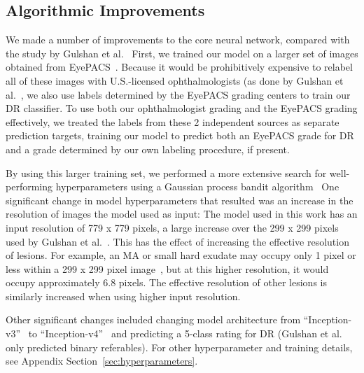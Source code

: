 \documentclass{llncs}
\begin{document}
\subsection{Algorithmic Improvements}
We made a number of improvements to the core neural network, compared with the study by Gulshan et al.~\cite{gulshan2016development} First, we trained our model on a larger set of images obtained from EyePACS~\cite{cuadros2009eyepacs}. Because it would be prohibitively expensive to relabel all of these images with U.S.-licensed ophthalmologists (as done by Gulshan et al.~\cite{gulshan2016development}, we also use labels determined by the EyePACS grading centers to train our DR classifier. To use both our ophthalmologist grading and the EyePACS grading effectively, we treated the labels from these 2 independent sources as separate prediction targets, training our model to predict both an EyePACS grade for DR and a grade determined by our own labeling procedure, if present.


By using this larger training set, we performed a more extensive search for well-performing hyperparameters using a Gaussian process bandit algorithm~\cite{golovin2017google} One significant change in model hyperparameters that resulted was an increase in the resolution of images the model used as input: The model used in this work has an input resolution of 779 x 779 pixels, a large increase over the 299 x 299 pixels used by Gulshan et al.~\cite{gulshan2016development}. This has the effect of increasing the effective resolution of lesions. For example, an MA or small hard exudate may occupy only 1 pixel or less within a 299 x 299 pixel image~\cite{kolb1995facts,scanlon2017practical}, but at this higher resolution, it would occupy approximately 6.8 pixels. The effective resolution of other lesions is similarly increased when using higher input resolution.

Other significant changes included changing model architecture from ``Inception-v3''~\cite{szegedy2016rethinking} to ``Inception-v4''~\cite{szegedy2017inception} and predicting a 5-class rating for DR (Gulshan et al.~\cite{gulshan2016development} only predicted binary referables). For other hyperparameter and training details, see Appendix Section~\ref{sec:hyperparameters}.
\end{document}
